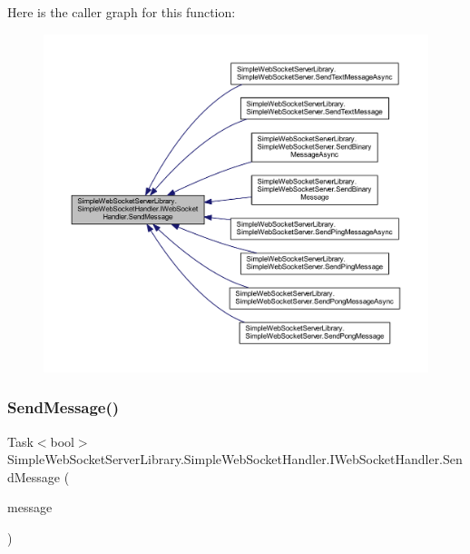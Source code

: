 Here is the caller graph for this function\+:
\nopagebreak
\begin{figure}[H]
\begin{center}
\leavevmode
\includegraphics[width=350pt]{interface_simple_web_socket_server_library_1_1_simple_web_socket_handler_1_1_i_web_socket_handler_a3d9b246d14117c85014486b3f5bb71c8_icgraph}
\end{center}
\end{figure}
\mbox{\label{interface_simple_web_socket_server_library_1_1_simple_web_socket_handler_1_1_i_web_socket_handler_a1b44785a16efa0750d5eb7e42aab28b8}} 
\subsubsection{\texorpdfstring{Send\+Message()}{SendMessage()}\hspace{0.1cm}{\footnotesize\ttfamily [2/2]}}
{\footnotesize\ttfamily Task$<$bool$>$ Simple\+Web\+Socket\+Server\+Library.\+Simple\+Web\+Socket\+Handler.\+I\+Web\+Socket\+Handler.\+Send\+Message (\begin{DoxyParamCaption}\item[{\mbox{\hyperlink{class_simple_web_socket_server_library_1_1_web_socket_message_container}{Web\+Socket\+Message\+Container}}}]{message }\end{DoxyParamCaption})}



